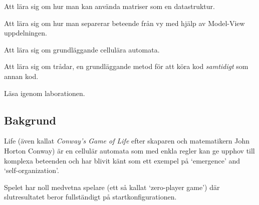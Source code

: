 

\Lab{\LabWeekTWELVE}

\begin{Goals}
    \item Att lära sig om hur man kan använda matriser som en datastruktur.
    \item Att lära sig om hur man separerar beteende från vy med hjälp av Model-View uppdelningen.
    \item Att lära sig om grundläggande cellulära automata. %
    \item Att lära sig om trådar, en grundläggande metod för att köra kod \emph{samtidigt} som annan kod.
\end{Goals}

\begin{Preparations}
    \item Läsa igenom laborationen.
\end{Preparations}

\subsection{Bakgrund}


Life (även kallat \emph{Conway's Game of Life} efter skaparen och matematikern John Horton Conway)
är en cellulär automata som med enkla regler kan ge upphov till komplexa beteenden och har blivit känt som ett exempel på `emergence' and `self-organization'.

Spelet har noll medvetna spelare (ett så kallat `zero-player game') där slutresultatet beror fullständigt på startkonfigurationen.


